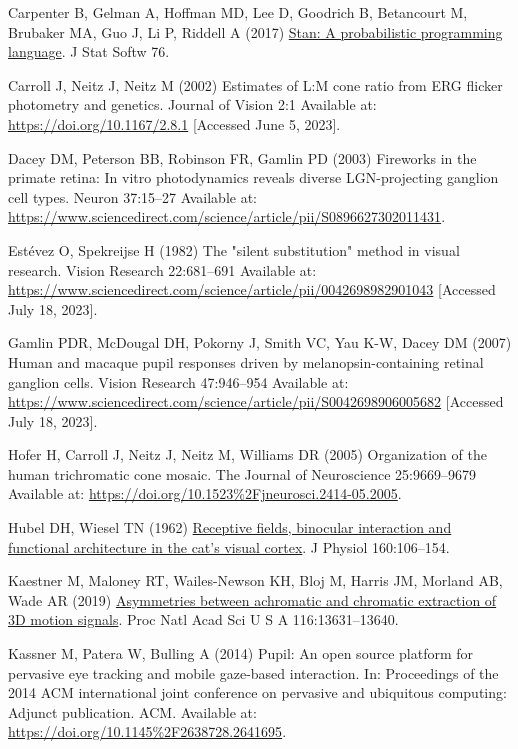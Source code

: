 \documentclass[
]{article}
\newlength{\cslhangindent}
\newenvironment{CSLReferences}[2] %
 {\begin{list}{}{%
  \setlength{\itemindent}{0pt}
  \setlength{\leftmargin}{0pt}
  \setlength{\parsep}{0pt}
  \ifodd #1
   \setlength{\leftmargin}{\cslhangindent}
   \setlength{\itemindent}{-1\cslhangindent}
  \fi
  \setlength{\itemsep}{#2\baselineskip}}}
 {\end{list}}
\begin{document}
\begin{CSLReferences}{1}{1}
Carpenter B, Gelman A, Hoffman MD, Lee D, Goodrich B, Betancourt M, Brubaker MA, Guo J, Li P, Riddell A (2017) \href{https://doi.org/10.18637/jss.v076.i01}{Stan: A probabilistic programming language}. J Stat Softw 76.

Carroll J, Neitz J, Neitz M (2002) Estimates of {L}:{M} cone ratio from {ERG} flicker photometry and genetics. Journal of Vision 2:1 Available at: \url{https://doi.org/10.1167/2.8.1} {[}Accessed June 5, 2023{]}.

Dacey DM, Peterson BB, Robinson FR, Gamlin PD (2003) Fireworks in the primate retina: In vitro photodynamics reveals diverse LGN-projecting ganglion cell types. Neuron 37:15--27 Available at: \url{https://www.sciencedirect.com/science/article/pii/S0896627302011431}.

Estévez O, Spekreijse H (1982) The "silent substitution" method in visual research. Vision Research 22:681--691 Available at: \url{https://www.sciencedirect.com/science/article/pii/0042698982901043} {[}Accessed July 18, 2023{]}.

Gamlin PDR, McDougal DH, Pokorny J, Smith VC, Yau K-W, Dacey DM (2007) Human and macaque pupil responses driven by melanopsin-containing retinal ganglion cells. Vision Research 47:946--954 Available at: \url{https://www.sciencedirect.com/science/article/pii/S0042698906005682} {[}Accessed July 18, 2023{]}.

Hofer H, Carroll J, Neitz J, Neitz M, Williams DR (2005) Organization of the human trichromatic cone mosaic. The Journal of Neuroscience 25:9669--9679 Available at: \url{https://doi.org/10.1523\%2Fjneurosci.2414-05.2005}.

Hubel DH, Wiesel TN (1962) \href{https://doi.org/10.1113/jphysiol.1962.sp006837}{Receptive fields, binocular interaction and functional architecture in the cat's visual cortex}. J Physiol 160:106--154.

Kaestner M, Maloney RT, Wailes-Newson KH, Bloj M, Harris JM, Morland AB, Wade AR (2019) \href{https://doi.org/10.1073/pnas.1817202116}{Asymmetries between achromatic and chromatic extraction of 3D motion signals}. Proc Natl Acad Sci U S A 116:13631--13640.

Kassner M, Patera W, Bulling A (2014) Pupil: An open source platform for pervasive eye tracking and mobile gaze-based interaction. In: Proceedings of the 2014 {ACM} international joint conference on pervasive and ubiquitous computing: Adjunct publication. {ACM}. Available at: \url{https://doi.org/10.1145\%2F2638728.2641695}.


\end{CSLReferences}
\end{document}
